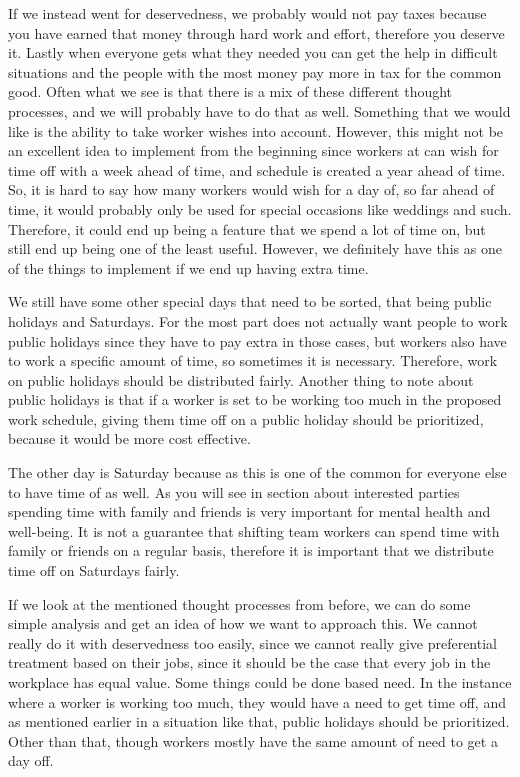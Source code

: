 If we instead went for deservedness, we probably would not pay taxes because you have earned that money through hard work and effort, therefore you deserve it. 
Lastly when everyone gets what they needed you can get the help in difficult situations and the people with the most money pay more in tax for the common good.
Often what we see is that there is a mix of these different thought processes, and we will probably have to do that as well. 
Something that we would like is the ability to take worker wishes into account. However, this might not be an excellent idea to implement from the beginning since workers at \siemens can wish for time off with a week ahead of time, and schedule is created a year ahead of time. So, it is hard to say how many workers would wish for a day of, so far ahead of time, it would probably only be used for special occasions like weddings and such. Therefore, it could end up being a feature that we spend a lot of time on, but still end up being one of the least useful. However, we definitely have this as one of the things to implement if we end up having extra time. 

We still have some other special days that need to be sorted, that being public holidays and Saturdays. For the most part \siemens does not actually want people to work public holidays since they have to pay extra in those cases, but workers also have to work a specific amount of time, so sometimes it is necessary. Therefore, work on public holidays should be distributed fairly. Another thing to note about public holidays is that if a worker is set to be working too much in the proposed work schedule, giving them time off on a public holiday should be prioritized, because it would be more cost effective. 

The other day is Saturday because as this is one of the common for everyone else to have time of as well. As you will see in section about interested parties spending time with family and friends is very important for mental health and well-being. It is not a guarantee that shifting team workers can spend time with family or friends on a regular basis, therefore it is important that we distribute time off on Saturdays fairly. 

If we look at the mentioned thought processes from before, we can do some simple analysis and get an idea of how we want to approach this. 
We cannot really do it with deservedness too easily, since we cannot really give preferential treatment based on their jobs, since it should be the case that every job in the workplace has equal value.
Some things could be done based need. In the instance where a worker is working too much, they would have a need to get time off, and as mentioned earlier in a situation like that, public holidays should be prioritized. Other than that, though workers mostly have the same amount of need to get a day off. 

